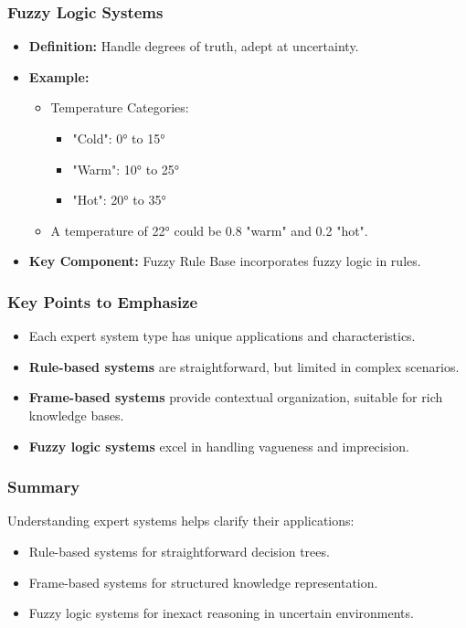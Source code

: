 \documentclass[aspectratio=169]{beamer}
\begin{document}
\begin{frame}[fragile]
    \frametitle{Fuzzy Logic Systems}
    \begin{itemize}
        \item \textbf{Definition:} Handle degrees of truth, adept at uncertainty.
        \item \textbf{Example:} 
        \begin{itemize}
            \item Temperature Categories:
            \begin{itemize}
                \item "Cold": 0° to 15°
                \item "Warm": 10° to 25°
                \item "Hot": 20° to 35°
            \end{itemize}
            \item A temperature of 22° could be 0.8 "warm" and 0.2 "hot".
        \end{itemize}
        \item \textbf{Key Component:} Fuzzy Rule Base incorporates fuzzy logic in rules.
    \end{itemize}
\end{frame}

\begin{frame}[fragile]
    \frametitle{Key Points to Emphasize}
    \begin{itemize}
        \item Each expert system type has unique applications and characteristics.
        \item \textbf{Rule-based systems} are straightforward, but limited in complex scenarios.
        \item \textbf{Frame-based systems} provide contextual organization, suitable for rich knowledge bases.
        \item \textbf{Fuzzy logic systems} excel in handling vagueness and imprecision.
    \end{itemize}
\end{frame}

\begin{frame}[fragile]
    \frametitle{Summary}
    Understanding expert systems helps clarify their applications:
    \begin{itemize}
        \item Rule-based systems for straightforward decision trees.
        \item Frame-based systems for structured knowledge representation.
        \item Fuzzy logic systems for inexact reasoning in uncertain environments.
    \end{itemize}
\end{frame}
\end{document}
